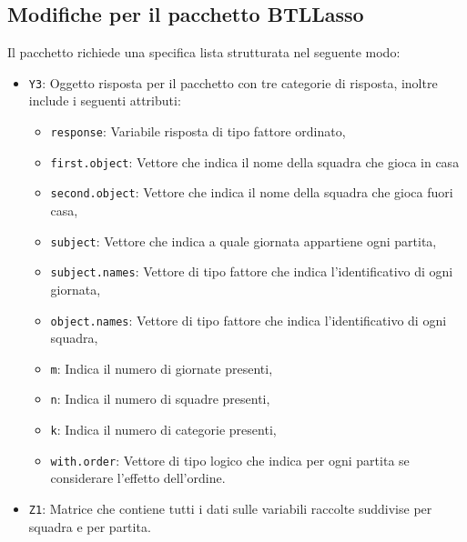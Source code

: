\subsection{Modifiche per il pacchetto BTLLasso}
Il pacchetto richiede una specifica lista strutturata nel seguente modo:
\begin{itemize}
	\item \texttt{Y3}: Oggetto risposta per il pacchetto con tre categorie di risposta, inoltre include i seguenti attributi: 
	\begin{itemize}
		\item \texttt{response}: Variabile risposta di tipo fattore ordinato,
		\item \texttt{first.object}: Vettore che indica il nome della squadra che gioca in casa
		\item \texttt{second.object}: Vettore che indica il nome della squadra che gioca fuori casa,
		\item \texttt{subject}: Vettore che indica a quale giornata appartiene ogni partita,
		\item \texttt{subject.names}: Vettore di tipo fattore che indica l'identificativo di ogni giornata,
		\item \texttt{object.names}: Vettore di tipo fattore che indica l'identificativo di ogni squadra,
		\item \texttt{m}: Indica il numero di giornate presenti,
		\item \texttt{n}: Indica il numero di squadre presenti,
		\item \texttt{k}: Indica il numero di categorie presenti,
		\item \texttt{with.order}: Vettore di tipo logico che indica per ogni partita se considerare l'effetto dell'ordine.				
	\end{itemize}
	\item \texttt{Z1}: Matrice che contiene tutti i dati sulle variabili raccolte suddivise per squadra e per partita.
\end{itemize} 


